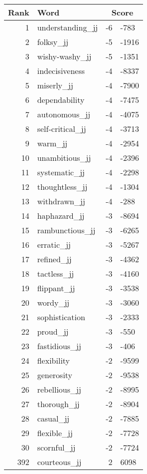 \begin{longtable}[!htbp]{| rlr@{.}l |}
    \hline
    \textbf{Rank} & \textbf{Word} & \multicolumn{2}{c|}{\textbf{Score}} \\
    \hline
    \endhead
    1 & understanding\_jj & -6 & -783 \\
    2 & folksy\_jj & -5 & -1916 \\
    3 & wishy-washy\_jj & -5 & -1351 \\
    4 & indecisiveness & -4 & -8337 \\
    5 & miserly\_jj & -4 & -7900 \\
    6 & dependability & -4 & -7475 \\
    7 & autonomous\_jj & -4 & -4075 \\
    8 & self-critical\_jj & -4 & -3713 \\
    9 & warm\_jj & -4 & -2954 \\
    10 & unambitious\_jj & -4 & -2396 \\
    11 & systematic\_jj & -4 & -2298 \\
    12 & thoughtless\_jj & -4 & -1304 \\
    13 & withdrawn\_jj & -4 & -288 \\
    14 & haphazard\_jj & -3 & -8694 \\
    15 & rambunctious\_jj & -3 & -6265 \\
    16 & erratic\_jj & -3 & -5267 \\
    17 & refined\_jj & -3 & -4362 \\
    18 & tactless\_jj & -3 & -4160 \\
    19 & flippant\_jj & -3 & -3538 \\
    20 & wordy\_jj & -3 & -3060 \\
    21 & sophistication & -3 & -2333 \\
    22 & proud\_jj & -3 & -550 \\
    23 & fastidious\_jj & -3 & -406 \\
    24 & flexibility & -2 & -9599 \\
    25 & generosity & -2 & -9538 \\
    26 & rebellious\_jj & -2 & -8995 \\
    27 & thorough\_jj & -2 & -8904 \\
    28 & casual\_jj & -2 & -7885 \\
    29 & flexible\_jj & -2 & -7728 \\
    30 & scornful\_jj & -2 & -7724 \\
    392 & courteous\_jj & 2 & 6098 \\

\end{longtable}
